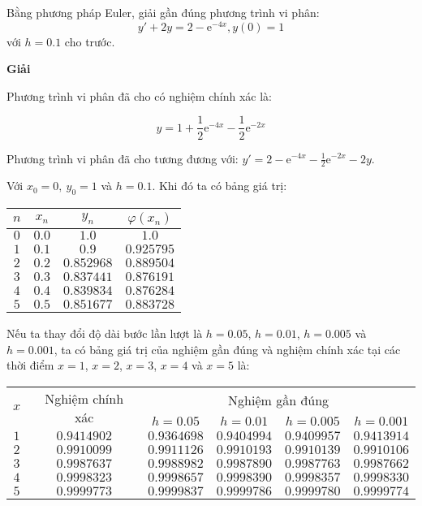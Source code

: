 \begin{example}
	Bằng phương pháp Euler, giải gần đúng phương trình vi phân:
	$$y'+2y=2-{\mathrm{e}^{-4x}},y(0)=1$$
	với $h=0.1$ cho trước.\par
\end{example}

\textbf{Giải}\par
Phương trình vi phân đã cho có nghiệm chính xác là:\par
$$y=1+\frac{1}{2}{\mathrm{e}^{-4x}}-\frac{1}{2}{\mathrm{e}^{-2x}}$$

Phương trình vi phân đã cho tương đương với: $y'=2-\mathrm{e}^{-4x}-\frac12\mathrm{e}^{-2x}-2y$.\par
Với $x_0=0,~y_0=1$ và $h=0.1$. Khi đó ta có bảng giá trị:
\begin{center}\begin{tabular}{|c|c|c|c|}\hline
	$n$ & $x_n$ & $y_n$      & $\varphi(x_n)$ \\\hline
	$0$ & $0.0$ & $1.0$      & $1.0$      \\\hline
	$1$ & $0.1$ & $0.9$      & $0.925795$ \\\hline
	$2$ & $0.2$ & $0.852968$ & $0.889504$ \\\hline
	$3$ & $0.3$ & $0.837441$ & $0.876191$ \\\hline
	$4$ & $0.4$ & $0.839834$ & $0.876284$ \\\hline
	$5$ & $0.5$ & $0.851677$ & $0.883728$ \\\hline
\end{tabular}\end{center}

Nếu ta thay đổi độ dài bước lần lượt là $h=0.05$, $h=0.01$, $h=0.005$ và $h=0.001$, ta có bảng giá trị của nghiệm gần đúng và nghiệm chính xác tại các thời điểm $x=1$, $x=2$, $x=3$, $x=4$ và $x=5$ là:\par
\begin{center}\begin{tabular}{|c|c|c|c|c|c|}\hline
	\multirow{2}{*}{$x$} & \multirow{2}{*}{Nghiệm chính xác} & \multicolumn{4}{c|}{Nghiệm gần đúng}\\\cline{3-6}
	    &             & $h=0.05$    & $h=0.01$    & $h=0.005$   & $h=0.001$   \\\hline
	$1$ & $0.9414902$ & $0.9364698$ & $0.9404994$ & $0.9409957$ & $0.9413914$ \\\hline
	$2$ & $0.9910099$ & $0.9911126$ & $0.9910193$ & $0.9910139$ & $0.9910106$ \\\hline
	$3$ & $0.9987637$ & $0.9988982$ & $0.9987890$ & $0.9987763$ & $0.9987662$ \\\hline
	$4$ & $0.9998323$ & $0.9998657$ & $0.9998390$ & $0.9998357$ & $0.9998330$ \\\hline
	$5$ & $0.9999773$ & $0.9999837$ & $0.9999786$ & $0.9999780$ & $0.9999774$ \\\hline
\end{tabular}\end{center}

